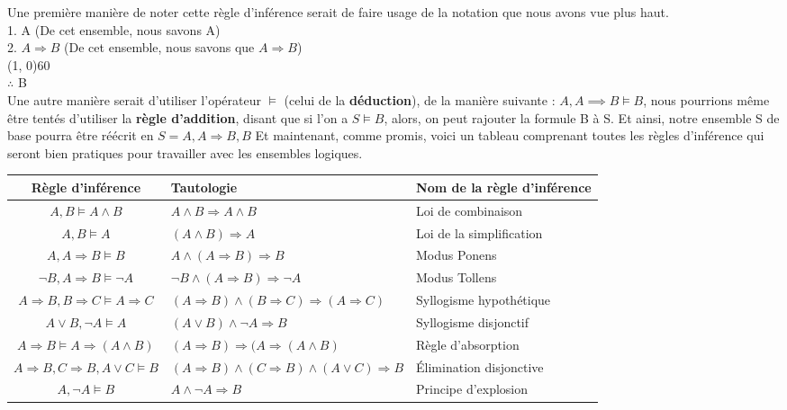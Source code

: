 \documentclass[a4paper, 12pt]{article}
\newcommand{\imply}{\Rightarrow}
\numberwithin{equation}{subsection}
\begin{document}
  Une première manière de noter cette règle d'inférence serait de faire usage de la notation que nous avons vue plus haut. \\[0.5cm]
    1. A (De cet ensemble, nous savons A) \\
    2. $A \imply B$ (De cet ensemble, nous savons que $A \imply B$) \\
  \hspace{10cm}\line(1, 0){60} \\
  $\therefore$ B \\[0.5cm]
  Une autre manière serait d'utiliser l'opérateur $\vDash$ (celui de la {\bf déduction}), de la manière suivante : $A, A \implies B \vDash B$, nous pourrions même être tentés d'utiliser la {\bf règle d'addition}, disant que si l'on a $S \vDash B$, alors, on peut rajouter la formule B à S. Et ainsi, notre ensemble S de base pourra être réécrit en $S = {A, A \imply B, B}$
  Et maintenant, comme promis, voici un tableau comprenant toutes les règles d'inférence qui seront bien pratiques pour travailler avec les ensembles logiques.
  \FloatBarrier
  \begin{adjustwidth}{300pt}{0pt}
    \begin{table}[H]
    \begin{tabular}{|c|M{5.0cm}|p{5.0cm}|}
      \hline Règle d'inférence & Tautologie & Nom de la règle d'inférence \\
      \hline $A, B \vDash A \land B$ & $A \land B \imply A \land B$& Loi de combinaison \\
      \hline $A, B \vDash A$ & $(A \land B) \imply A $& Loi de la simplification \\
      \hline $A, A \imply B \vDash B$ & $A \land (A \imply B) \imply B $ & Modus Ponens \\
      \hline $\neg B, A \imply B \vDash \neg A$ & $\neg B \land (A \imply B) \imply \neg A$ & Modus Tollens \\
      \hline $A \imply B, B \imply C \vDash A \imply C$ & $(A \imply B) \land (B \imply C) \imply (A \imply C)$ & Syllogisme hypothétique \\
      \hline $A \lor B, \neg A \vDash A$ & $(A \lor B) \land \neg A \imply B$ & Syllogisme disjonctif \\
      \hline $A \imply B \vDash A \imply (A \land B)$ & $(A \imply B) \imply (A \imply (A \land B)$ & Règle d'absorption \\
      \hline $A \imply B, C \imply B, A \lor C \vDash B$ & $(A \imply B) \land (C \imply B) \land (A \lor C) \imply B$ & Élimination disjonctive\\
      \hline $A, \neg A \vDash B$ & $A \land \neg A \imply B$ & Principe d'explosion \\
      \hline
    \end{tabular}
  \end{table}
\end{adjustwidth}
\end{document}
